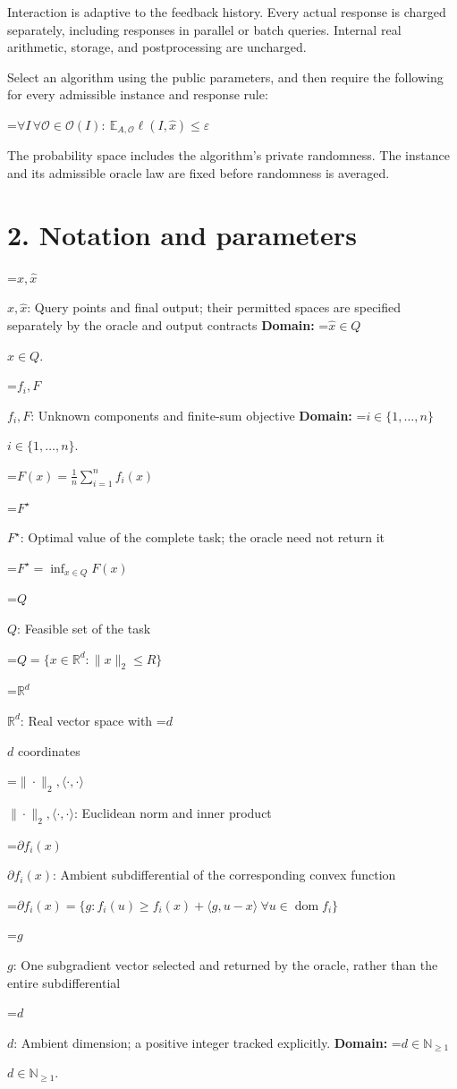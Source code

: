 \documentclass[10pt,a4paper]{article}
\newcommand{\AtlasMath}[1]{\par\begingroup\centering\setbox0=\hbox{$\displaystyle #1$}\ifdim\wd0>1.4\linewidth\typeout{ATLAS WIDE FORMULA: \the\wd0}\fi\ifdim\wd0>\linewidth\resizebox{\linewidth}{!}{\box0}\else\box0\fi\par\endgroup}
\newcommand{\AtlasInlineMath}[1]{\begingroup\setbox0=\hbox{$#1$}\ifdim\wd0>.4\linewidth\endgroup\AtlasMath{#1}\else\endgroup$#1$\fi}
\begin{document}
Interaction is adaptive to the feedback history. Every actual response is charged separately, including responses in parallel or batch queries. Internal real arithmetic, storage, and postprocessing are uncharged.

Select an algorithm using the public parameters, and then require the following for every admissible instance and response rule:


\AtlasMath{\forall I\,\forall\mathcal{O}\in\mathcal{O}(I):\ \mathbb{E}_{A,\mathcal{O}}\ell(I,\widehat{x})\le\varepsilon}


The probability space includes the algorithm's private randomness. The instance and its admissible oracle law are fixed before randomness is averaged.

\section{2. Notation and parameters}
\AtlasInlineMath{x,\widehat{x}}: Query points and final output; their permitted spaces are specified separately by the oracle and output contracts \textbf{Domain:} \AtlasInlineMath{\widehat{x}\in Q}.

\AtlasInlineMath{f_i,F}: Unknown components and finite-sum objective \textbf{Domain:} \AtlasInlineMath{i\in\{1,\ldots,n\}}.


\AtlasMath{F(x)=\frac1n\sum_{i=1}^n f_i(x)}


\AtlasInlineMath{F^\star}: Optimal value of the complete task; the oracle need not return it


\AtlasMath{F^\star=\inf_{x\in Q}F(x)}


\AtlasInlineMath{Q}: Feasible set of the task


\AtlasMath{Q=\{x\in\mathbb{R}^d:\|x\|_2\le R\}}


\AtlasInlineMath{\mathbb{R}^d}: Real vector space with \AtlasInlineMath{d} coordinates

\AtlasInlineMath{\|\cdot\|_2,\langle\cdot,\cdot\rangle}: Euclidean norm and inner product

\AtlasInlineMath{\partial f_i(x)}: Ambient subdifferential of the corresponding convex function


\AtlasMath{\partial f_i(x)=\{g:f_i(u)\ge f_i(x)+\langle g,u-x\rangle\ \forall u\in\operatorname{dom}f_i\}}


\AtlasInlineMath{g}: One subgradient vector selected and returned by the oracle, rather than the entire subdifferential

\AtlasInlineMath{d}: Ambient dimension; a positive integer tracked explicitly. \textbf{Domain:} \AtlasInlineMath{d\in\mathbb{N}_{\ge1}}.
\end{document}
